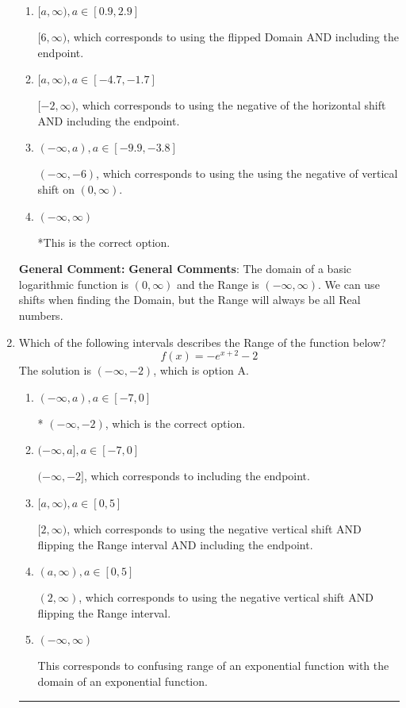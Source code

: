 \documentclass{extbook}[14pt]
\newcommand{\litem}[1]{\item #1

\rule{\textwidth}{0.4pt}}
\begin{document}
\begin{enumerate}
{\begin{enumerate}[label=\Alph*.]
$(-\infty, 6)$, which corresponds to using the vertical shift while the Range is $(-\infty, \infty)$.
\item \( [a, \infty), a \in [0.9, 2.9] \)

$[6, \infty)$, which corresponds to using the flipped Domain AND including the endpoint.
\item \( [a, \infty), a \in [-4.7, -1.7] \)

$[-2, \infty)$, which corresponds to using the negative of the horizontal shift AND including the endpoint.
\item \( (-\infty, a), a \in [-9.9, -3.8] \)

$(-\infty, -6)$, which corresponds to using the using the negative of vertical shift on $(0, \infty)$.
\item \( (-\infty, \infty) \)

*This is the correct option.
\end{enumerate}

\textbf{General Comment:} \textbf{General Comments}: The domain of a basic logarithmic function is $(0, \infty)$ and the Range is $(-\infty, \infty)$. We can use shifts when finding the Domain, but the Range will always be all Real numbers.
}
\litem{
Which of the following intervals describes the Range of the function below?
\[ f(x) = -e^{x+2}-2 \]The solution is \( (-\infty, -2) \), which is option A.\begin{enumerate}[label=\Alph*.]
\item \( (-\infty, a), a \in [-7, 0] \)

* $(-\infty, -2)$, which is the correct option.
\item \( (-\infty, a], a \in [-7, 0] \)

$(-\infty, -2]$, which corresponds to including the endpoint.
\item \( [a, \infty), a \in [0, 5] \)

$[2, \infty)$, which corresponds to using the negative vertical shift AND flipping the Range interval AND including the endpoint.
\item \( (a, \infty), a \in [0, 5] \)

$(2, \infty)$, which corresponds to using the negative vertical shift AND flipping the Range interval.
\item \( (-\infty, \infty) \)

This corresponds to confusing range of an exponential function with the domain of an exponential function.
\end{enumerate}

}
\end{enumerate}
\end{document}
